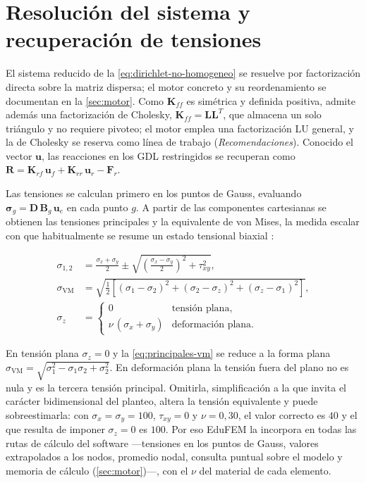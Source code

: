 \section{Resolución del sistema y recuperación de tensiones}
\label{sec:resolucion-tensiones}

El sistema reducido de la \autoref{eq:dirichlet-no-homogeneo} se resuelve por factorización directa sobre la matriz dispersa; el motor concreto y su reordenamiento se documentan en la \autoref{sec:motor}. Como $\bm{K}_{ff}$ es simétrica y definida positiva, admite además una factorización de Cholesky, $\bm{K}_{ff} = \bm{L}\bm{L}^{T}$, que almacena un solo triángulo y no requiere pivoteo; el motor emplea una factorización LU general, y la de Cholesky se reserva como línea de trabajo (\emph{Recomendaciones}). Conocido el vector $\bm{u}$, las reacciones en los GDL restringidos se recuperan como $\bm{R} = \bm{K}_{rf}\,\bm{u}_f + \bm{K}_{rr}\,\bm{u}_r - \bm{F}_r$.

Las tensiones se calculan primero en los puntos de Gauss, evaluando $\bm{\sigma}_g = \bm{D}\,\bm{B}_g\,\bm{u}_e$ en cada punto $g$. A partir de las componentes cartesianas se obtienen las tensiones principales \autocite[pp.~12-14]{timoshenko1970elasticity} y la equivalente de von Mises, la medida escalar con que habitualmente se resume un estado tensional biaxial \autocite[p.~117]{cook2002concepts}:

\begin{equation}
\begin{aligned}
\sigma_{1,2} &= \frac{\sigma_x + \sigma_y}{2} \pm \sqrt{\left(\frac{\sigma_x - \sigma_y}{2}\right)^2 + \tau_{xy}^2}, \\
\sigma_{\mathrm{VM}} &= \sqrt{\tfrac{1}{2}\left[(\sigma_1-\sigma_2)^2 + (\sigma_2-\sigma_z)^2 + (\sigma_z-\sigma_1)^2\right]}, \\
\sigma_z &=
\begin{cases}
0 & \text{tensión plana,}\\
\nu\,(\sigma_x+\sigma_y) & \text{deformación plana.}
\end{cases}
\end{aligned}
\label{eq:principales-vm}
\end{equation}

En tensión plana $\sigma_z = 0$ y la \autoref{eq:principales-vm} se reduce a la forma plana $\sigma_{\mathrm{VM}} = \sqrt{\sigma_1^2 - \sigma_1\sigma_2 + \sigma_2^2}$. En deformación plana la tensión fuera del plano no es nula y es la tercera tensión principal. Omitirla, simplificación a la que invita el carácter bidimensional del planteo, altera la tensión equivalente y puede sobreestimarla: con $\sigma_x = \sigma_y = 100$, $\tau_{xy} = 0$ y $\nu = 0{,}30$, el valor correcto es $40$ y el que resulta de imponer $\sigma_z = 0$ es $100$. Por eso EduFEM la incorpora en todas las rutas de cálculo del software —tensiones en los puntos de Gauss, valores extrapolados a los nodos, promedio nodal, consulta puntual sobre el modelo y memoria de cálculo (\autoref{sec:motor})—, con el $\nu$ del material de cada elemento.

